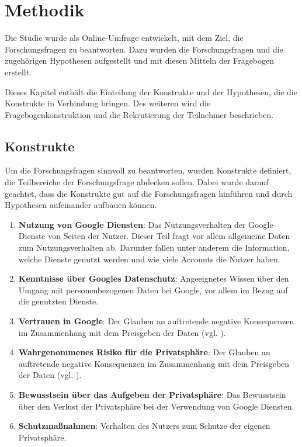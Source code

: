 %
% 

\chapter{Methodik}

Die Studie wurde als Online-Umfrage entwickelt, mit dem Ziel, die Forschungsfragen zu beantworten. Dazu wurden die Forschungsfragen und die zugehörigen Hypothesen aufgestellt und mit diesen Mitteln der Fragebogen erstellt. 

Dieses Kapitel enthält die Einteilung der Konstrukte und der Hypothesen, die die Konstrukte in Verbindung bringen. 
Des weiteren wird die Fragebogenkonstruktion und die Rekrutierung der Teilnehmer beschrieben.

\section{Konstrukte}
\label{sec:categories}
Um die Forschungsfragen sinnvoll zu beantworten, wurden Konstrukte definiert, die Teilbereiche der Forschungsfrage abdecken sollen. Dabei wurde darauf geachtet, dass die Konstrukte gut auf die Forschungsfragen hinführen und durch Hypothesen aufeinander aufbauen können.

\begin{enumerate}
\item \label{itm:Kat0}\textbf{Nutzung von Google Diensten}: Das Nutzungsverhalten der Google Dienste von Seiten der Nutzer. Dieser Teil fragt vor allem allgemeine Daten zum Nutzungsverhalten ab. Darunter fallen unter anderem die Information, welche Dienste genutzt werden und wie viele Accounts die Nutzer haben.
\item \label{itm:Kat1}\textbf{Kenntnisse über Googles Datenschutz}: Angeeignetes Wissen über den Umgang mit personenbezogenen Daten bei Google, vor allem im Bezug auf die genutzten Dienste.
\item \label{itm:Kat2}\textbf{Vertrauen in Google}: Der Glauben an auftretende negative Konsequenzen im Zusammenhang mit dem Preisgeben der Daten (vgl. \citet{kim2008trust}).
\item \label{itm:Kat3}\textbf{Wahrgenommenes Risiko für die Privatsphäre}: Der Glauben an auftretende negative Konsequenzen im Zusammenhang mit dem Preisgeben der Daten (vgl. \citet{kim2008trust}).
\item \label{itm:Kat4}\textbf{Bewusstsein über das Aufgeben der Privatsphäre}: Das Bewusstsein über den Verlust der Privatsphäre bei der Verwendung von Google Diensten.
\item \label{itm:Kat5}\textbf{Schutzmaßnahmen}: Verhalten des Nutzers zum Schutze der eigenen Privatsphäre.
\end{enumerate}

